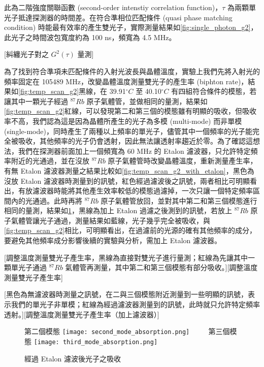 \documentclass[class=NCU_thesis, crop=false]{standalone}
\begin{document}
此為二階強度關聯函數 (second-order intenstiy correlation function)，$\tau$ 為兩顆單光子抵達探測器的時間差。在符合準相位匹配條件 (quasi phase matching condition) 時能最有效率的產生雙光子，實際測量結果如\cref{fig:single_photon_g2}，此光子之時間波包寬度約為 100 ns，頻寬為 4.5 MHz。

[糾纏光子對之 $G^{2}(\tau)$ 量測]


為了找到符合準項未匹配條件的入射光波長與晶體溫度，實驗上我們先將入射光的頻率固定在 105489 MHz，改變晶體溫度測量雙光子的產生率 (biphton rate)，結果如\cref{fig:temp_scan_g2}黑線，在 39.91$^{\circ}C$ 至 40.10$^{\circ}C$ 有四組符合條件的模態，若讓其中一顆光子經過 $^{87}Rb$ 原子氣體管，並做相同的量測，結果如\cref{fig:temp_scan_g2}紅線，可以發現第二和第三個的模態雖有明顯的吸收，但吸收率不高，我們認為這是因為晶體所產生的光子為多模 (multi-mode) 而非單模 (single-mode)，同時產生了兩種以上頻率的單光子，儘管其中一個頻率的光子能完全被吸收，其他頻率的光子仍會透射，因此無法讓透射率趨近於零。為了確認這想法，我們在探測器前面加上一個頻寬為 60 MHz 的 Etalon 濾波器，只允許特定頻率附近的光通過，並在沒放 $^{87}Rb$ 原子氣體管時改變晶體溫度，重新測量產生率，有無 Etalon 濾波器測量之結果比較如\cref{fig:temp_scan_g2_with_etalon}，黑色為沒放 Etalon 濾波器時測量到的訊號，紅色經過濾波後之訊號，兩者相比可明顯看出，有放濾波器時能將其他產生效率較低的模態過濾掉，一次只讓一個特定頻率區間內的光通過。此時再將 $^{87}Rb$ 原子氣體管放回，並對其中第二和第三個模態進行相同的量測，結果如\cref{fig:absorption_etalon_temp_scanning}，黑線為加上 Etalon 過濾之後測到的訊號，若放上 $^{87}Rb$ 原子氣體管讓光子通過，測量結果如藍線，光子幾乎完全被吸收，與\cref{fig:temp_scan_g2}相比，可明顯看出，在過濾前的光源的確有其他頻率的成分，要避免其他頻率成分影響後續的實驗與分析，需加上 Etalon 濾波器。

[調整溫度測量雙光子產生率，黑線為直接對雙光子進行量測；紅線為先讓其中一顆單光子通過 $^{87}Rb$ 氣體管再測量，其中第二和第三個模態有部分吸收。][調整溫度測量雙光子產生率]

[黑色為無濾波器時測量之訊號，在二與三個模態附近測量到一些明顯的訊號，表示我們的單光子非單模；紅線為經過濾波器測量到的訊號，此時就只允許特定頻率透射。][調整溫度測量雙光子產生率（加上濾波器）]

\begin{figure}[!hbt]
    \centering
    \subcaptionbox
        {第二個模態
        \label{fig:subfig_fig1}}
        {\texttt{[image: second\_mode\_absorption.png]}}
    ~~~~
    \subcaptionbox
        {第三個模態
        \label{fig:subfig_fig2}}
        {\texttt{[image: third\_mode\_absorption.png]}}
    \caption{經過 Etalon 濾波後光子之吸收}
    \label{fig:absorption_etalon_temp_scanning}
\end{figure}
\end{document}
